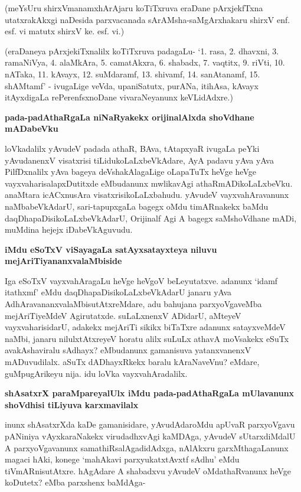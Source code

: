 \noindent
(meYsUru shirxVmanamxhArAjaru koTiTxruva eraDane pArxjekfTxna utatxrakAkxgi naDesida parxvacanada sA\-rAMsha-saMgArxhakaru shirxV enf. esf. vi matutx shirxV ke. esf. vi.)

(eraDaneya pArxjekiTxnalilx koTiTxruva padagaLu- `1. rasa, 2. dhavxni, 3. ramaNiVya, 4. alaMkAra, 5. camatAkxra, 6. shabadx, 7. vaqtitx, 9. riVti, 10. nATaka, 11. kAvayx, 12. suMdaramf, 13. shivamf, 14. sanAtanamf, 15. shAMtamf' - ivugaLige veVda, upaniSatutx, purANa, itihAsa, kAvayx itAyxdigaLa rePerenfsxnoDane vivaraNeyanunx keVLidAdxre.)

{\bigskip
\noindent
{\large\bf pada-padAthaRgaLa niNaRyakekx orijinalAlxda shoVdhane mADabeVku}}\label{page215}
\medskip

\noindent
loVkadalilx yAvudeV padada athaR, BAva, tAtapxyaR ivugaLa peYki yAvudanenxV visatxrisi tiLidu\-koLaLx\-beVkAdare, AyA padavu yAva yAva PilfDxnalilx yAva bageya deVshakAlagaLige oLapaTuTx heVge heVge vayxvaharisalapxDutitxde eMbudanunx mwlikavAgi athaRmADikoLaLxbeVku. anaMtara icACxnusAra visatxrisi\-koLaLxbahudu. yAvudeV vayxvahAravanunx naMbabeVkAdarU, sari-tapupxgaLa bagegx oMdu timARnakekx baMdu daqDhapaDisikoLaLxbeVkAdarU, Orijinalf Agi A bagegx saMshoVdhane mADi, muMdina hejejx iDabeVkAgu\-vudu.

{\bigskip
\noindent
{\large\bf iMdu eSoTxV viSayagaLa satAyxsatayxteya niluvu mejAriTiyananxvalaMbiside}}\label{page215}
\medskip

\noindent
Iga eSoTxV vayxvahAragaLu heVge heVgoV beLeyutatxve. adanunx `idamf itathxmf' eMdu daqDhapaDisikoLaLxbeVkAdarU janaru yAva AdhAravananxvalaMbi\-sutAtxreMdare, adu bahujana parxyoVga\-veMba mejAriTiyeMdeV Agirutatxde. suLaLxnenxV ADidarU, aMteyeV vayxvaharisidarU, adakekx mejAriTi sikikx biTaTxre adanunx satayxveMdeV naMbi, janaru nilulxtAtxreyeV horatu alilx suLuLx athavA moVsakekx eSuTx avakAshaviralu sAdhayx? eMbudanunx gamanisuva yatanxvanenxV mADuvudilalx. aSuTx dADhayxRkekx baralu kAraNaveVnu? eMdare, guMpugArikeyu nija. idu loVka vayxvahAradalilx.

{\bigskip
\noindent
{\large\bf shAsatxrX paraMpareyalUlx iMdu pada-padAthaRgaLa mUlavanunx shoVdhisi tiLiyuva karxmavilalx}}\label{page216}
\medskip

\noindent
inunx shAsatxrXda kaDe gamanisidare, yAvudAdaroMdu apUvaR parxyoVgavu pANiniya vAyxkaraNakekx virudadhxvAgi kaMDAga, yAvudeV sUtarxdiMdalU A parxyoVgavanunx samathiRsalAgadidAdxga, nAlAkxru garxMthagaLanunx magaci hAki, konege `mahAkavi parxyukatxtAvxtf sAdhu'\label{216} eMdu tiVmARnisutAtxre. hAgAdare A shabadxvu yAvudeV oMdathaRvanunx heVge koDutetx? eMba parxshenx baMdAga-

